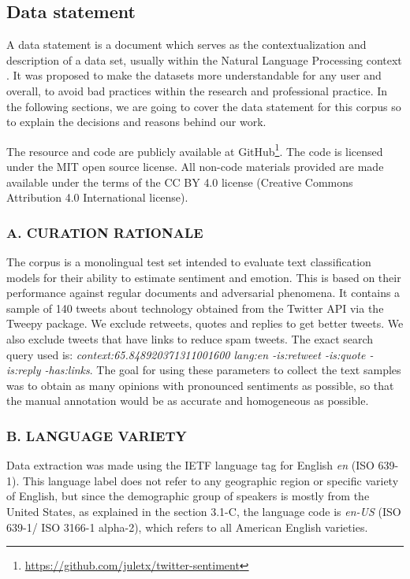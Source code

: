\documentclass[11pt,a4paper]{article}
\begin{document}
\subsection{Data statement}

A data statement is a document which serves as the contextualization and description of a data set, usually within the Natural Language Processing context \cite{bender-friedman-2018-data}. It was proposed to make the datasets more understandable for any user and overall, to avoid bad practices within the research and professional practice. In the following sections, we are going to cover the data statement for this corpus so to explain the decisions and reasons behind our work.

The resource and code are publicly available at GitHub\footnote{\url{https://github.com/juletx/twitter-sentiment}}. The code is licensed under the MIT open source license. All non-code materials provided are made available under the terms of the CC BY 4.0 license
(Creative Commons Attribution 4.0 International license).

\subsubsection*{A. CURATION RATIONALE}
The corpus is a monolingual test set intended to evaluate text classification models for their ability to estimate sentiment and emotion. This is based on their performance against regular documents and adversarial phenomena. It contains a sample of 140 tweets about technology obtained from the Twitter API via the Tweepy package. We exclude retweets, quotes and replies to get better tweets. We also exclude tweets that have links to reduce spam tweets. The exact search query used is:  \textit{context:65.848920371311001600 lang:en -is:retweet -is:quote -is:reply -has:links}. The goal for using these parameters to collect the text samples was to obtain as many opinions with pronounced sentiments as possible, so that the manual annotation would be as accurate and homogeneous as possible.

\subsubsection*{B. LANGUAGE VARIETY}
Data extraction was made using the IETF language tag for English \textit{en} (ISO 639-1). This language label does not refer to any geographic region or specific variety of English, but since the demographic group of speakers is mostly from the United States, as explained in the section 3.1-C, the language code is \textit{en-US} (ISO 639-1/ ISO 3166-1 alpha-2), which refers to all American English varieties.
\end{document}
